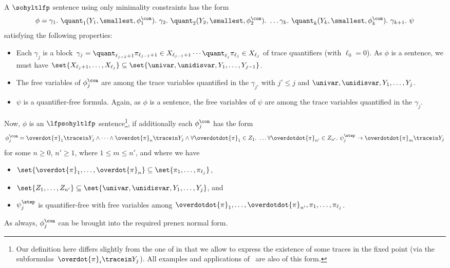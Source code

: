 A $\sohyltlfp$ sentence using only minimality constraints has the form 
\[
\phi = 
\gamma_1.\ \quant_1(Y_1, \smallest, \phi_1^\con).\ 
\gamma_2.\ \quant_2(Y_2, \smallest, \phi_2^\con).\ 
\ldots 
\gamma_k.\ \quant_k(Y_k, \smallest, \phi_k^\con).\
\gamma_{k+1}.\
\psi
\]
satisfying the following properties: 
\begin{itemize}
    \item Each $\gamma_j$ is a block~$
    \gamma_j = \quant_{\ell_{j-1}+1} \pi_{\ell_{j-1}+1} \in X_{\ell_{j-1}+1} \cdots \quant_{\ell_{j}} \pi_{\ell_{j}} \in X_{\ell_{j}} 
    $
    of trace quantifiers (with $\ell_0 = 0$). As $\phi$ is a sentence, we must have $\set{X_{\ell_j+1}, \ldots, X_{\ell_{j}}} \subseteq \set{\univar,\unidisvar, Y_1, \ldots, Y_{j-1}}$.

    \item The free variables of $\phi_j^\con$ are among the trace variables quantified in the $\gamma_{j'}$ with $j' \le j$ and $\univar,\unidisvar, Y_1, \ldots, Y_j$.
    
    \item $\psi$ is a quantifier-free formula. Again, as $\phi$ is a sentence, the free variables of $\psi$ are among the trace variables quantified in the $\gamma_j$.
\end{itemize}

Now, $\phi$ is an $\lfpsohyltlfp$ sentence\footnote{Our definition here differs slightly from the one of  \cite{DBLP:conf/cav/BeutnerFFM23} in that we allow to express the existence of some traces in the fixed point (via the subformulas~$\overdot{\pi}_i\tracein Y_j$). All examples and applications of~\cite{DBLP:conf/cav/BeutnerFFM23} are also of this form.}, if additionally each $\phi_j^\con$ has the form 
    \[ \phi_j^\con = \overdot{\pi}_1\tracein Y_j \wedge \cdots \wedge \overdot{\pi}_n \tracein Y_j \wedge   \forall \overdotdot{\pi}_1 \in Z_1.\ \ldots \forall \overdotdot{\pi}_{n'} \in Z_{n'}.\ \psi^\step_j \rightarrow \overdotdot{\pi}_m \tracein Y_j \]
 for some $n\ge 0$, $n' \ge 1$, where $1 \le m \le {n'}$, and where we have
\begin{itemize}
    \item $\set{\overdot{\pi}_1,\ldots, \overdot{\pi}_n} \subseteq \set{\pi_1, \ldots, \pi_{\ell_j} }$,
    \item $\set{Z_1, \ldots, Z_{n'}} \subseteq \set{\univar, \unidisvar, Y_1, \ldots, Y_j}$, and
    \item $\psi^\step_j$ is quantifier-free with free variables among $\overdotdot{\pi}_1, \ldots, \overdotdot{\pi}_{n'}, \pi_1, \ldots, \pi_{\ell_j}$.
\end{itemize} 
As always, $\phi_j^\con$ can be brought into the required prenex normal form.

